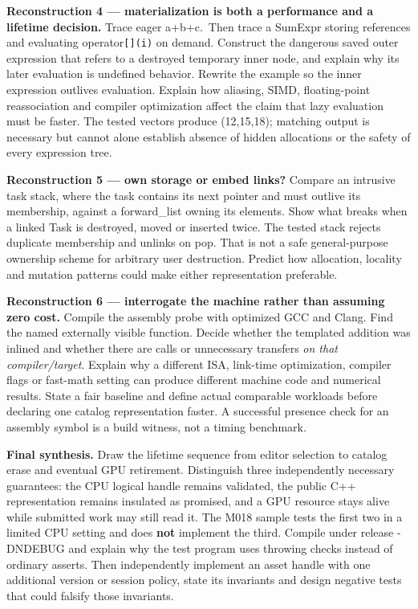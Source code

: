 \textbf{Reconstruction 4 --- materialization is both a performance and a lifetime decision.} Trace eager a+b+c.~Then trace a SumExpr storing references and evaluating operator\texttt{{[}{]}(i)} on demand. Construct the dangerous saved outer expression that refers to a destroyed temporary inner node, and explain why its later evaluation is undefined behavior. Rewrite the example so the inner expression outlives evaluation. Explain how aliasing, SIMD, floating-point reassociation and compiler optimization affect the claim that lazy evaluation must be faster. The tested vectors produce (12,15,18); matching output is necessary but cannot alone establish absence of hidden allocations or the safety of every expression tree.

\textbf{Reconstruction 5 --- own storage or embed links?} Compare an intrusive task stack, where the task contains its next pointer and must outlive its membership, against a forward\_list owning its elements. Show what breaks when a linked Task is destroyed, moved or inserted twice. The tested stack rejects duplicate membership and unlinks on pop. That is not a safe general-purpose ownership scheme for arbitrary user destruction. Predict how allocation, locality and mutation patterns could make either representation preferable.

\textbf{Reconstruction 6 --- interrogate the machine rather than assuming zero cost.} Compile the assembly probe with optimized GCC and Clang. Find the named externally visible function. Decide whether the templated addition was inlined and whether there are calls or unnecessary transfers \emph{on that compiler/target}. Explain why a different ISA, link-time optimization, compiler flags or fast-math setting can produce different machine code and numerical results. State a fair baseline and define actual comparable workloads before declaring one catalog representation faster. A successful presence check for an assembly symbol is a build witness, not a timing benchmark.

\textbf{Final synthesis.} Draw the lifetime sequence from editor selection to catalog erase and eventual GPU retirement. Distinguish three independently necessary guarantees: the CPU logical handle remains validated, the public C++ representation remains insulated as promised, and a GPU resource stays alive while submitted work may still read it. The M018 sample tests the first two in a limited CPU setting and does \textbf{not} implement the third. Compile under release -DNDEBUG and explain why the test program uses throwing checks instead of ordinary asserts. Then independently implement an asset handle with one additional version or session policy, state its invariants and design negative tests that could falsify those invariants.

